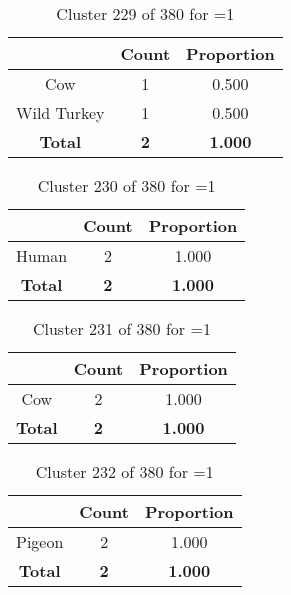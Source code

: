 \begin{table}[ht!]
\centering
\begin{tabular}{|c|c|c|}
\hline
\bf \Spec{} &\bf Count &\bf Proportion\\ \hline \hline
Cow & 1 & 0.500\\ \hline
Wild Turkey & 1 & 0.500\\ \hline
\hline
\bf Total & \bf 2 & \bf 1.000\\ \hline
\end{tabular}
\label{tab:cluster:229:1}
\caption{Cluster 229 of 380 for \minneigh{}=1}
\end{table}

\clearpage
\begin{table}[ht!]
\centering
\begin{tabular}{|c|c|c|}
\hline
\bf \Spec{} &\bf Count &\bf Proportion\\ \hline \hline
Human & 2 & 1.000\\ \hline
\hline
\bf Total & \bf 2 & \bf 1.000\\ \hline
\end{tabular}
\label{tab:cluster:230:1}
\caption{Cluster 230 of 380 for \minneigh{}=1}
\end{table}

\begin{table}[ht!]
\centering
\begin{tabular}{|c|c|c|}
\hline
\bf \Spec{} &\bf Count &\bf Proportion\\ \hline \hline
Cow & 2 & 1.000\\ \hline
\hline
\bf Total & \bf 2 & \bf 1.000\\ \hline
\end{tabular}
\label{tab:cluster:231:1}
\caption{Cluster 231 of 380 for \minneigh{}=1}
\end{table}

\begin{table}[ht!]
\centering
\begin{tabular}{|c|c|c|}
\hline
\bf \Spec{} &\bf Count &\bf Proportion\\ \hline \hline
Pigeon & 2 & 1.000\\ \hline
\hline
\bf Total & \bf 2 & \bf 1.000\\ \hline
\end{tabular}
\label{tab:cluster:232:1}
\caption{Cluster 232 of 380 for \minneigh{}=1}
\end{table}

